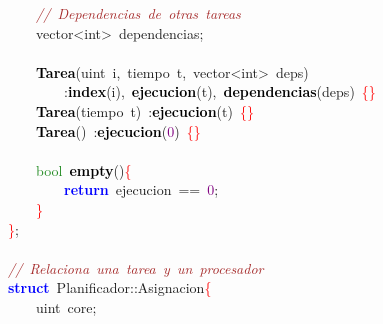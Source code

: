 \mbox{}\ \ \ \ \textit{\textcolor{Brown}{//\ Dependencias\ de\ otras\ tareas}} \\
\mbox{}\ \ \ \ \textcolor{TealBlue}{vector\textless{}int\textgreater{}}\ dependencias\textcolor{BrickRed}{;} \\
\mbox{} \\
\mbox{}\ \ \ \ \textbf{\textcolor{Black}{Tarea}}\textcolor{BrickRed}{(}\textcolor{TealBlue}{uint}\ i\textcolor{BrickRed}{,}\ \textcolor{TealBlue}{tiempo}\ t\textcolor{BrickRed}{,}\ \textcolor{TealBlue}{vector\textless{}int\textgreater{}}\ deps\textcolor{BrickRed}{)} \\
\mbox{}\ \ \ \ \ \ \ \ \textcolor{BrickRed}{:}\textbf{\textcolor{Black}{index}}\textcolor{BrickRed}{(}i\textcolor{BrickRed}{),}\ \textbf{\textcolor{Black}{ejecucion}}\textcolor{BrickRed}{(}t\textcolor{BrickRed}{),}\ \textbf{\textcolor{Black}{dependencias}}\textcolor{BrickRed}{(}deps\textcolor{BrickRed}{)}\ \textcolor{Red}{\{\}} \\
\mbox{}\ \ \ \ \textbf{\textcolor{Black}{Tarea}}\textcolor{BrickRed}{(}\textcolor{TealBlue}{tiempo}\ t\textcolor{BrickRed}{)}\ \textcolor{BrickRed}{:}\textbf{\textcolor{Black}{ejecucion}}\textcolor{BrickRed}{(}t\textcolor{BrickRed}{)}\ \textcolor{Red}{\{\}} \\
\mbox{}\ \ \ \ \textbf{\textcolor{Black}{Tarea}}\textcolor{BrickRed}{()}\ \textcolor{BrickRed}{:}\textbf{\textcolor{Black}{ejecucion}}\textcolor{BrickRed}{(}\textcolor{Purple}{0}\textcolor{BrickRed}{)}\ \textcolor{Red}{\{\}} \\
\mbox{} \\
\mbox{}\ \ \ \ \textcolor{ForestGreen}{bool}\ \textbf{\textcolor{Black}{empty}}\textcolor{BrickRed}{()}\textcolor{Red}{\{} \\
\mbox{}\ \ \ \ \ \ \ \ \textbf{\textcolor{Blue}{return}}\ ejecucion\ \textcolor{BrickRed}{==}\ \textcolor{Purple}{0}\textcolor{BrickRed}{;} \\
\mbox{}\ \ \ \ \textcolor{Red}{\}} \\
\mbox{}\textcolor{Red}{\}}\textcolor{BrickRed}{;} \\
\mbox{} \\
\mbox{}\textit{\textcolor{Brown}{//\ Relaciona\ una\ tarea\ y\ un\ procesador}} \\
\mbox{}\textbf{\textcolor{Blue}{struct}}\ \textcolor{TealBlue}{Planificador}\textcolor{BrickRed}{::}Asignacion\textcolor{Red}{\{} \\
\mbox{}\ \ \ \ \textcolor{TealBlue}{uint}\ core\textcolor{BrickRed}{;} \\

